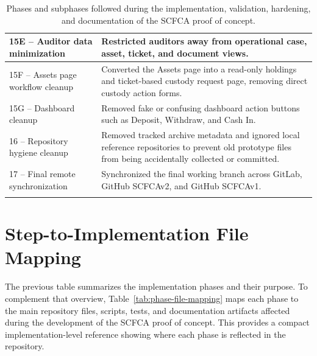 \documentclass[12pt,a4paper]{report}
\begin{document}
\begin{longtable}{|p{6.2cm}|p{10cm}|}
 15E -- Auditor data minimization &
Restricted auditors away from operational case, asset, ticket, and document views. \\
\hline

 15F -- Assets page workflow cleanup &
Converted the Assets page into a read-only holdings and ticket-based custody request page, removing direct custody action forms. \\
\hline

 15G -- Dashboard cleanup &
Removed fake or confusing dashboard action buttons such as Deposit, Withdraw, and Cash In. \\
\hline

 16 -- Repository hygiene cleanup &
Removed tracked archive metadata and ignored local reference repositories to prevent old prototype files from being accidentally collected or committed. \\
\hline

 17 -- Final remote synchronization &
Synchronized the final working branch across GitLab, GitHub SCFCAv2, and GitHub SCFCAv1. \\
\hline

\caption{Phases and subphases followed during the implementation, validation, hardening, and documentation of the SCFCA proof of concept.}
\label{tab:phases-of-work}
\end{longtable}

\endgroup

\section{Step-to-Implementation File Mapping}

The previous table summarizes the implementation phases and their purpose. 
To complement that overview, Table~\ref{tab:phase-file-mapping} maps each phase to the main repository files, scripts, tests, and documentation artifacts affected during the development of the SCFCA proof of concept. 
This provides a compact implementation-level reference showing where each phase is reflected in the repository.

\begingroup
\footnotesize
\setlength{\tabcolsep}{5pt}
\setlength{\extrarowheight}{5pt}
\renewcommand{\arraystretch}{1.45}
\end{document}
